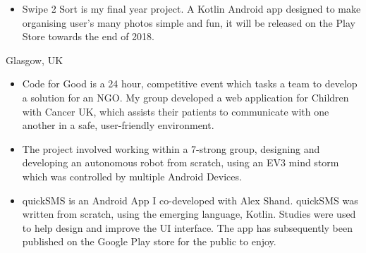 \documentclass[9pt,a4paper]{altacv}
\begin{document}

\begin{itemize}
\item Swipe 2 Sort is my final year project. A Kotlin Android app designed to make organising user's many photos simple and fun, it will be released on the Play Store towards the end of 2018.
\end{itemize}
\divider


  {Glasgow, UK}
\begin{itemize}
\item Code for Good is a 24 hour, competitive event which tasks a team to develop a solution for an NGO. My group developed a web application for Children with Cancer UK, which assists their patients to communicate with one another in a safe, user-friendly environment.
\end{itemize}
\divider

\begin{itemize}
\item The project involved working within a 7-strong group, designing and developing an autonomous robot from scratch, using an EV3 mind storm which was controlled by multiple Android Devices.
\end{itemize}
\divider

\begin{itemize}
\item quickSMS is an Android App I co-developed with Alex Shand. quickSMS was written from scratch, using the emerging language, Kotlin. Studies were used to help design and improve the UI interface. The app has subsequently been published on the Google Play store for the public to enjoy.
\end{itemize}
\divider
\end{document}
